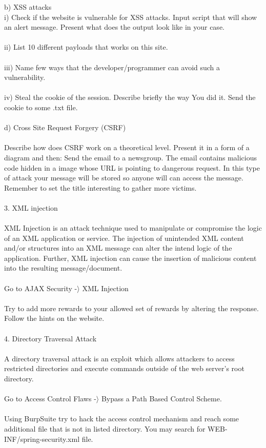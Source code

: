 \documentclass[12pt, a4paper]{article}
\begin{document}
b) XSS attacks\\
i) Check if the website is vulnerable for XSS attacks. Input script that will show an alert message. Present what does the output look like in your case.\\
\\
ii) List 10 different payloads that works on this site.\\
\\
iii) Name few ways that the developer/programmer can avoid such a vulnerability.\\
\\
iv) Steal the cookie of the session. Describe briefly the way You did it. Send the cookie to some .txt file.\\
\\
d) Cross Site Request Forgery (CSRF)\\
\\
Describe how does CSRF work on a theoretical level. Present it in a form of a diagram and then:
Send the email to a newsgroup. The email contains malicious code hidden in a image whose URL is pointing to dangerous request. In this type of attack your message will be stored so anyone will can access the message. Remember to set the title interesting to gather more victims.\\
\\
3. XML injection\\
\\
XML Injection is an attack technique used to manipulate or compromise the logic of an XML application or service. The injection of unintended XML content and/or structures into an XML message can alter the intend logic of the application. Further, XML injection can cause the insertion of malicious content into the resulting message/document.\\
\\
Go to AJAX Security -$\rangle$ XML Injection\\
\\
Try to add more rewards to your allowed set of rewards by altering the response. Follow the hints on the website.\\
\\
4. Directory Traversal Attack\\
\\
A directory traversal attack is an exploit which allows attackers to access restricted directories and execute commands outside of the web server's root directory.\\
\\
Go to Access Control Flaws -$\rangle$ Bypass a Path Based Control Scheme.\\
\\
Using BurpSuite try to hack the access control mechanism and reach some additional file that is not in listed directory. You may search for WEB-INF/spring-security.xml file.\\
\end{document}
